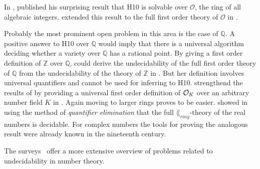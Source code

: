 In \citeyear{Rumely1986}, \textcite{Rumely1986} published his surprising result
that \textsc{H10} is solvable over \(\mathcal O\), the ring of all algebraic
integers. \Textcite{Dries1988} extended this result to the full first order
theory of \(\mathcal O\) in \citeyear{Dries1988}.

Probably the most prominent open problem in this area is the case of \(ℚ\). A
positive answer to \textsc{H10} over \(ℚ\) would imply that there is a universal
algorithm deciding whether a variety over \(ℚ\) has a rational point. By giving
a first order definition of \(ℤ\) over \(ℚ\), \textcite{Robinson1949} could
derive the undecidability of the full first order theory of \(ℚ\) from the
undecidability of the theory of \(ℤ\) in \citeyear{Robinson1949}. But her
definition involves universal quantifiers and cannot be used for inferring to
\textsc{H10}. \Textcite{Park2013} strengthend the results of
\textcite{Robinson1949,Robinson1959} by providing a universal first order
definition of \(\mathcal{O}_{K}\) over an arbitrary number field \(K\) in
\citeyear{Park2013}. Again moving to larger rings proves to be easier.
\textcite{Tarski1931} showed in \citeyear{Tarski1931} using the method of
\emph{quantifier elimination} that the full \(\lang_{ring}\)-theory of the real
numbers is decidable. For complex numbers the tools for proving the analogous
result were already known in the nineteenth century.

The surveys~\cite{Koenigsmann2014,Poonen2008} offer a more extensive overview of
problems related to undecidability in number theory.

